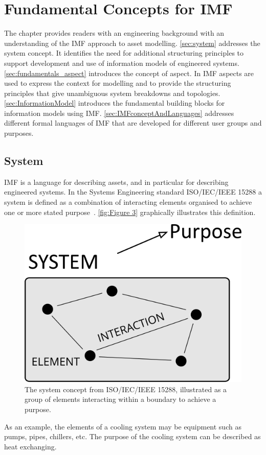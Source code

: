 \documentclass[../main.tex]{subfiles}
\begin{document}
\chapter{Fundamental Concepts for IMF}
\label{ch:Chapter 2}
\label{ch:FundamentalConcepts}


The chapter provides readers with an engineering background
with an understanding of the IMF approach to asset modelling. 
 \autoref{sec:system} addresses the system concept. It identifies the need for additional structuring principles to support development and use of information models of engineered systems.  
\autoref{sec:fundamentals_aspect} introduces the concept of aspect.  In IMF aspects are used to express the context for modelling and to provide the structuring principles that give unambiguous system breakdowns and topologies.
 \autoref{sec:InformationModel} 
introduces  the fundamental  building blocks for information models using IMF. 
\autoref{sec:IMFconceptAndLanguages} 
addresses different formal languages of IMF that are developed for
different user groups and purposes. 


\section{System}
\label{sec:system}
IMF is a language for describing assets, and in particular for describing
engineered systems. In the Systems Engineering standard ISO/IEC/IEEE
15288 a system is defined as a combination of interacting elements organised to achieve one  or more stated purpose~\cite{15288}. \autoref{fig:Figure 3} graphically illustrates this definition.

\begin{figure}[htb]
  \centering
  \includegraphics[width=.3\textwidth]{img/IMFmanual-img003.png}
  \caption{The system concept from ISO/IEC/IEEE
15288, illustrated as a group of elements interacting within a boundary to achieve a purpose.}
  \label{fig:Figure 3}
\end{figure}

As an example, the elements of a cooling system may be equipment such as pumps, pipes, chillers, etc. The purpose of the cooling system can be described as heat exchanging.
\end{document}
